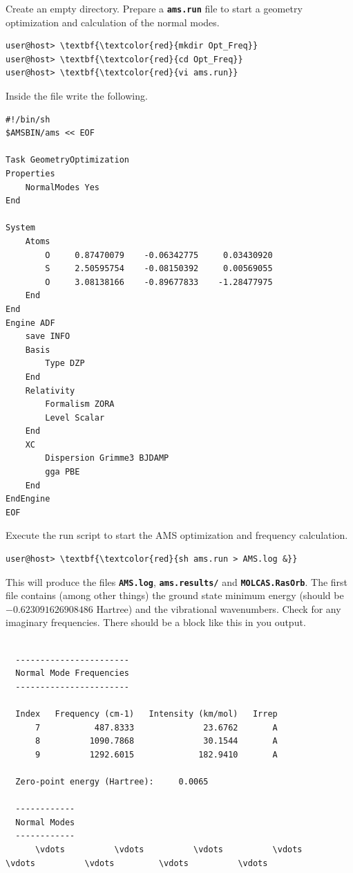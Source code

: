 \documentclass[a4paper,11pt,DIV=15,openany]{scrbook}
\newcommand{\ttt}[1]{\textbf{\texttt{#1}}}
\begin{document}
Create an empty directory. 
Prepare a \ttt{ams.run} file to start a geometry optimization and calculation of the normal modes.
\begin{Verbatim}[commandchars=\\\{\}]
user@host> \textbf{\textcolor{red}{mkdir Opt_Freq}}
user@host> \textbf{\textcolor{red}{cd Opt_Freq}}
user@host> \textbf{\textcolor{red}{vi ams.run}}
\end{Verbatim}
Inside the file write the following.
\begin{oframed}
\footnotesize\begin{Verbatim}[commandchars=\\\{\}]
#!/bin/sh 
$AMSBIN/ams << EOF 
 
Task GeometryOptimization 
Properties 
    NormalModes Yes 
End 
 
System 
    Atoms 
        O     0.87470079    -0.06342775     0.03430920 
        S     2.50595754    -0.08150392     0.00569055 
        O     3.08138166    -0.89677833    -1.28477975 
    End 
End 
Engine ADF 
    save INFO 
    Basis 
        Type DZP 
    End 
    Relativity 
        Formalism ZORA 
        Level Scalar 
    End 
    XC
        Dispersion Grimme3 BJDAMP
        gga PBE
    End 
EndEngine
EOF
\end{Verbatim}
\end{oframed}

\normalsize

Execute the run script to start the \textsc{AMS} optimization and frequency calculation.
\begin{Verbatim}[commandchars=\\\{\}]
user@host> \textbf{\textcolor{red}{sh ams.run > AMS.log &}}
\end{Verbatim}
This will produce the files \ttt{AMS.log}, \ttt{ams.results/} and \ttt{MOLCAS.RasOrb}. 
The first file contains (among other things) the ground state minimum energy (should be $-0.623091626908486$ Hartree) and the vibrational wavenumbers. 
Check for any imaginary frequencies.
There should be a block like this in you output.
\begin{oframed}
\footnotesize\begin{Verbatim}[commandchars=\\\{\}]

  -----------------------
  Normal Mode Frequencies
  -----------------------
 
  Index   Frequency (cm-1)   Intensity (km/mol)   Irrep
      7           487.8333              23.6762       A
      8          1090.7868              30.1544       A
      9          1292.6015             182.9410       A
 
  Zero-point energy (Hartree):     0.0065
 
  ------------
  Normal Modes
  ------------
      \vdots          \vdots          \vdots          \vdots         \vdots          \vdots         \vdots          \vdots
\end{Verbatim}
\end{oframed}
\end{document}
